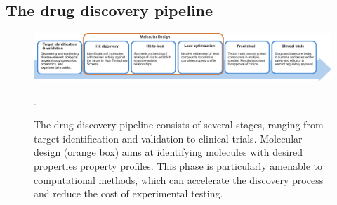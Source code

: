 \subsection{The drug discovery pipeline}
\begin{figure}
      \centering
      \includegraphics[width=\textwidth]{figures/drug-discovery-pipeline_v2.pdf}
      \caption{The drug discovery pipeline consists of several stages, ranging from target identification
            and validation to clinical trials. Molecular design (orange box) aims at identifying
            molecules with desired properties property profiles. This phase is particularly amenable to
            computational methods, which can accelerate the discovery process and reduce the cost of
            experimental testing.\label{fig:drug-discovery-pipeline}}.
\end{figure}


